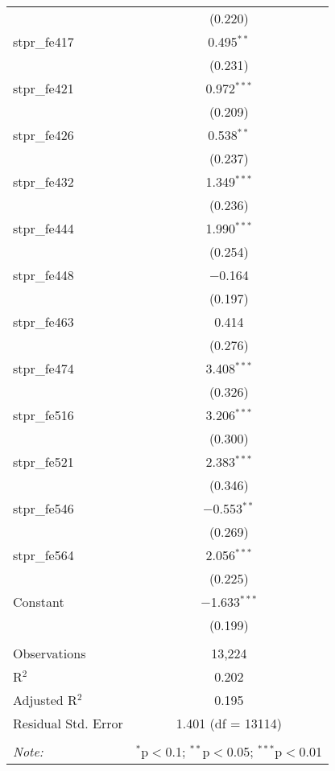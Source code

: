 \begin{table}[!htbp]
\begin{tabular}{@{\extracolsep{5pt}}lc}
  & (0.220) \\ 
  stpr\_fe417 & 0.495$^{**}$ \\ 
  & (0.231) \\ 
  stpr\_fe421 & 0.972$^{***}$ \\ 
  & (0.209) \\ 
  stpr\_fe426 & 0.538$^{**}$ \\ 
  & (0.237) \\ 
  stpr\_fe432 & 1.349$^{***}$ \\ 
  & (0.236) \\ 
  stpr\_fe444 & 1.990$^{***}$ \\ 
  & (0.254) \\ 
  stpr\_fe448 & $-$0.164 \\ 
  & (0.197) \\ 
  stpr\_fe463 & 0.414 \\ 
  & (0.276) \\ 
  stpr\_fe474 & 3.408$^{***}$ \\ 
  & (0.326) \\ 
  stpr\_fe516 & 3.206$^{***}$ \\ 
  & (0.300) \\ 
  stpr\_fe521 & 2.383$^{***}$ \\ 
  & (0.346) \\ 
  stpr\_fe546 & $-$0.553$^{**}$ \\ 
  & (0.269) \\ 
  stpr\_fe564 & 2.056$^{***}$ \\ 
  & (0.225) \\ 
  Constant & $-$1.633$^{***}$ \\ 
  & (0.199) \\ 
 \hline \\[-1.8ex] 
Observations & 13,224 \\ 
R$^{2}$ & 0.202 \\ 
Adjusted R$^{2}$ & 0.195 \\ 
Residual Std. Error & 1.401 (df = 13114) \\ 
\hline 
\hline \\[-1.8ex] 
\textit{Note:}  & \multicolumn{1}{r}{$^{*}$p$<$0.1; $^{**}$p$<$0.05; $^{***}$p$<$0.01} \\ 
\end{tabular} 
\end{table} 

